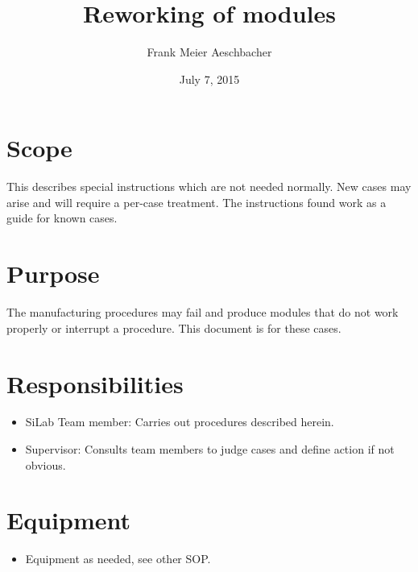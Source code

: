 \documentclass[12pt]{unlsilabsop}
\title{Reworking of modules}
\date{July 7, 2015}
\author{Frank Meier Aeschbacher}
\begin{document}
\maketitle

\section{Scope}
This describes special instructions which are not needed normally. New cases may arise and will require a per-case treatment. The instructions found work as a guide for known cases.

\section{Purpose}
The manufacturing procedures may fail and produce modules that do not work properly or interrupt a procedure. This document is for these cases.


\section{Responsibilities}

\begin{itemize}
    \item SiLab Team member: Carries out procedures described herein.
    \item Supervisor: Consults team members to judge cases and define action if not obvious.
\end{itemize}

\section{Equipment}

\begin{itemize}
    \item Equipment as needed, see other SOP.
\end{itemize}
\end{document}
